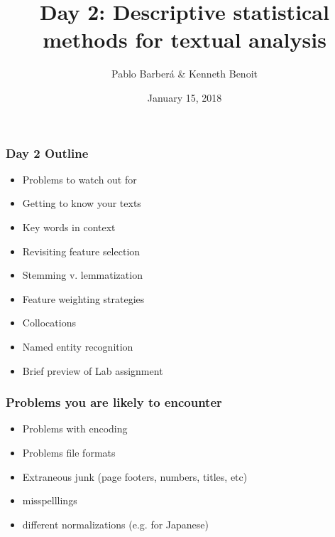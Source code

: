 \documentclass[11pt,handout]{beamer}
\title[Day 2:\newline Descriptive Statistics]{Day 2: Descriptive statistical methods for textual analysis}
\author[]{Pablo Barber\'{a} \& Kenneth Benoit}\institute[LSE
\date{January 15, 2018}
\begin{document}
\begin{frame}%
 \titlepage
\end{frame}


\begin{frame}
 \frametitle{Day 2 Outline}
 \begin{itemize}
  \item Problems to watch out for
  \item Getting to know your texts
  \item Key words in context
  \item Revisiting feature selection
  \item Stemming v. lemmatization
  \item Feature weighting strategies
  \item Collocations
  \item Named entity recognition
  \item Brief preview of Lab assignment
 \end{itemize}
\end{frame}

\begin{frame}
 \frametitle{Problems you are likely to encounter}
 \begin{itemize}
  \item \pause Problems with encoding
  \item \pause Problems file formats
  \item \pause Extraneous junk (page footers, numbers, titles, etc)
  \item \pause misspelllings
  \item \pause different normalizations (e.g. for Japanese)
 \end{itemize}
\end{frame}
\end{document}
